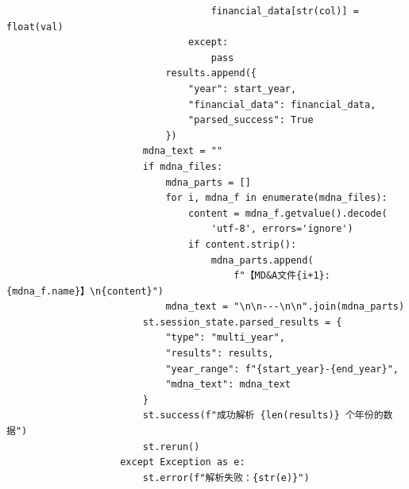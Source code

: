 \documentclass[a4paper,10pt]{article}
\begin{document}
\begin{lstlisting}
                                    financial_data[str(col)] = float(val)
                                except:
                                    pass
                            results.append({
                                "year": start_year,
                                "financial_data": financial_data,
                                "parsed_success": True
                            })
                        mdna_text = ""
                        if mdna_files:
                            mdna_parts = []
                            for i, mdna_f in enumerate(mdna_files):
                                content = mdna_f.getvalue().decode(
                                    'utf-8', errors='ignore')
                                if content.strip():
                                    mdna_parts.append(
                                        f"【MD&A文件{i+1}: {mdna_f.name}】\n{content}")
                            mdna_text = "\n\n---\n\n".join(mdna_parts)
                        st.session_state.parsed_results = {
                            "type": "multi_year",
                            "results": results,
                            "year_range": f"{start_year}-{end_year}",
                            "mdna_text": mdna_text
                        }
                        st.success(f"成功解析 {len(results)} 个年份的数据")
                        st.rerun()
                    except Exception as e:
                        st.error(f"解析失败：{str(e)}")
\end{lstlisting}
\end{document}
